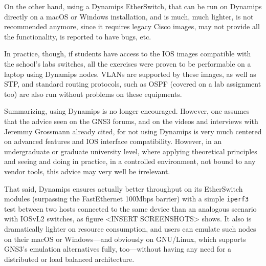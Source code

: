 On the other hand, using a Dynamips EtherSwitch, that can be run on Dynamips directly on a macOS or Windows installation, and is much, much lighter, is not recommended anymore, since it requires legacy Cisco images, may not provide all the functionality, is reported to have bugs, etc.

In practice, though, if students have access to the IOS images compatible with the school's labs switches, all the exercises were proven to be performable on a laptop using Dynamips nodes.
VLANs are supported by these images, as well as STP, and standard routing protocols, such as OSPF (covered on a lab assignment too) are also run without problems on these equipments.

Summarizing, using Dynamips is no longer encouraged.
However, one assumes that the advice seen on the GNS3 forums, and on the videos and interviews with Jeremmy Grossmann already cited, for not using Dynamips is very much centered on advanced features and IOS interface compatibility.
However, in an undergraduate or graduate university level, where applying theoretical principles and seeing and doing in practice, in a controlled environment, not bound to any vendor tools, this advice may very well be irrelevant.

That said, Dynamips ensures actually better throughput on its EtherSwitch modules (surpassing the FastEthernet 100Mbps barrier) with a simple \texttt{iperf3} test between two hosts connected to the same device than an analogous scenario with IOSvL2 switches, as figure <INSERT SCREENSHOTS> shows.
It also is dramatically lighter on resource consumption, and users can emulate such nodes on their macOS or Windows---and obviously on GNU/Linux, which supports GNS3's emulation alternatives fully, too---without having any need for a distributed or load balanced architecture.

